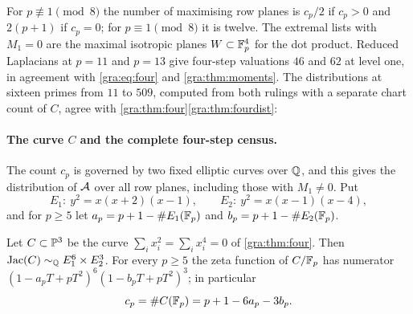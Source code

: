 
\begin{remark}
For $p\not\equiv1\pmod8$ the number of maximising row planes is $c_p/2$ if
$c_p>0$ and $2(p+1)$ if $c_p=0$; for $p\equiv1\pmod8$ it is twelve. The
extremal lists with $M_1=0$ are the maximal isotropic planes
$W\subset\mathbb{F}_p^4$ for the dot product. Reduced Laplacians at $p=11$ and
$p=13$ give four-step valuations $46$ and $62$ at level one, in agreement
with \eqref{gra:eq:four} and \cref{gra:thm:moments}. The distributions at
sixteen primes from $11$ to $509$, computed from both rulings with a
separate chart count of $C$, agree with
\cref{gra:thm:four}\ref{gra:thm:fourdist}:
\end{remark}

\paragraph{The curve $C$ and the complete four-step census.}
The count $c_p$ is governed by two fixed elliptic curves over $\mathbb{Q}$, and
this gives the distribution of $\mathcal{A}$ over all row planes, including those
with $M_1\ne0$. Put
\[
 E_1:\ y^2=x(x+2)(x-1),\qquad E_2:\ y^2=x(x-1)(x-4),
\]
and for $p\ge5$ let $a_p=p+1-\#E_1(\mathbb{F}_p)$ and $b_p=p+1-\#E_2(\mathbb{F}_p)$.

\begin{theorem}\label{gra:thm:jacobian}
Let $C\subset\mathbb{P}^3$ be the curve $\sum_ix_i^2=\sum_ix_i^4=0$ of
\cref{gra:thm:four}. Then $\operatorname{Jac}(C)\sim_{\mathbb{Q}} E_1^6\times E_2^3$. For every
$p\ge5$ the zeta function of $C/\mathbb{F}_p$ has numerator
$(1-a_pT+pT^2)^6(1-b_pT+pT^2)^3$; in particular
\[
 c_p=\#C(\mathbb{F}_p)=p+1-6a_p-3b_p .
\]
\end{theorem}

